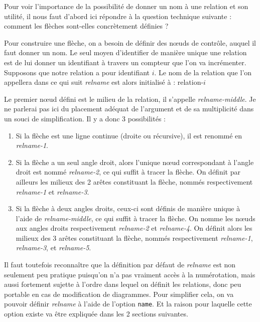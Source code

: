\documentclass[a4paper,11pt]{report}
\newcommand{\inputTikZ}[1]{%
  }%
\newcommand{\inputTikZ}[1]{%
    \texttt{[image: fig/\#1.pdf]}%
  }%
\begin{document}
Pour voir l'importance de la possibilité de donner un nom à une relation et son utilité, il nous faut d'abord ici répondre à la question technique suivante : comment les flèches sont-elles concrètement définies ?

Pour construire une flèche, on a besoin de définir des n\oe{}uds de contrôle, auquel il faut donner un nom. Le seul moyen d'identifier de manière unique une relation est de lui donner un identifiant à travers un compteur que l'on va incrémenter. Supposons que notre relation a pour identifiant $i$. Le nom de la relation que l'on appellera dans ce qui suit {\it relname} est alors initialisé à : relation-$i$

Le premier n\oe{}ud défini est le milieu de la relation, il s'appelle {\it relname-middle}. Je ne parlerai pas ici du placement adéquat de l'argument et de sa multiplicité dans un souci de simplification. Il y a donc 3 possibilités :

\begin{enumerate}
\item Si la flèche est une ligne continue (droite ou récursive), il est renommé en {\it relname-1}.

\begin{center}
\inputTikZ{figure25}
\end{center}
\item Si la flèche a un seul angle droit, alors l'unique n\oe{}ud correspondant à l'angle droit est nommé {\it relname-2}, ce qui suffit à tracer la flèche. On définit par ailleurs les milieux des 2 arêtes constituant la flèche, nommés respectivement {\it relname-1} et {\it relname-3}.

\begin{center}
\inputTikZ{figure26}
\end{center}
\item Si la flèche à deux angles droits, ceux-ci sont définis de manière unique à l'aide de {\it relname-middle}, ce qui suffit à tracer la flèche. On nomme les n\oe{}uds aux angles droits respectivement {\it relname-2} et {\it relname-4}. On définit alors les milieux des 3 arêtes constituant la flèche, nommés respectivement {\it relname-1}, {\it relname-3}, et {\it relname-5}.

\begin{center}
\inputTikZ{figure27}
\end{center}
\end{enumerate}

Il faut toutefois reconnaître que la définition par défaut de {\it relname} est non seulement peu pratique puisqu'on n'a pas vraiment accès à la numérotation, mais aussi fortement sujette à l'ordre dans lequel on définit les relations, donc peu portable en cas de modification de diagrammes. Pour simplifier cela, on va pouvoir définir {\it relname} à l'aide de l'option {\tt name}. Et la raison pour laquelle cette option existe va être expliquée dans les 2 sections suivantes.
\end{document}
